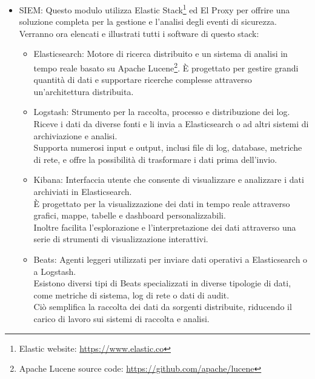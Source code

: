 \begin{itemize}
  \item SIEM: Questo modulo utilizza Elastic Stack\footnote{Elastic website: \url{https://www.elastic.co}}
    ed El Proxy per offrire una soluzione completa per la gestione e l'analisi degli
    eventi di sicurezza.\\ Verranno ora elencati e illustrati tutti i software di
    questo stack:
    \begin{itemize}
      \item Elasticsearch: Motore di ricerca distribuito e un sistema di analisi
        in tempo reale basato su Apache Lucene\footnote{Apache Lucene source
        code: \url{https://github.com/apache/lucene}}. È progettato per gestire
        grandi quantità di dati e supportare ricerche complesse attraverso un'architettura
        distribuita.

      \item Logstash: Strumento per la raccolta, processo e distribuzione dei log.\\
        Riceve i dati da diverse fonti e li invia a Elasticsearch o ad altri sistemi
        di archiviazione e analisi.\\ Supporta numerosi input e output, inclusi
        file di log, database, metriche di rete, e offre la possibilità di trasformare
        i dati prima dell'invio.

      \item Kibana: Interfaccia utente che consente di visualizzare e analizzare
        i dati archiviati in Elasticsearch.\\ È progettato per la
        visualizzazione dei dati in tempo reale attraverso grafici, mappe,
        tabelle e dashboard personalizzabili.\\ Inoltre facilita l'esplorazione
        e l'interpretazione dei dati attraverso una serie di strumenti di
        visualizzazione interattivi.

      \item Beats: Agenti leggeri utilizzati per inviare dati operativi a
        Elasticsearch o a Logstash.\\ Esistono diversi tipi di Beats
        specializzati in diverse tipologie di dati, come metriche di sistema,
        log di rete o dati di audit.\\ Ciò semplifica la raccolta dei dati da
        sorgenti distribuite, riducendo il carico di lavoro sui sistemi di raccolta
        e analisi.


\end{itemize}
\end{itemize}
